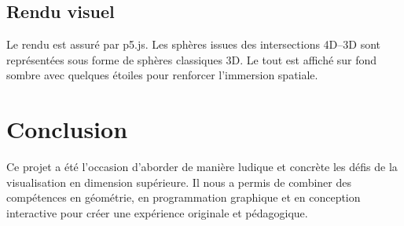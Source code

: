 \documentclass[11pt,a4paper]{article}
\begin{document}
\subsection{Rendu visuel}

Le rendu est assuré par p5.js. Les sphères issues des intersections 4D–3D sont représentées sous forme de sphères classiques 3D. Le tout est affiché sur fond sombre avec quelques étoiles pour renforcer l’immersion spatiale.

\section{Conclusion}

Ce projet a été l’occasion d’aborder de manière ludique et concrète les défis de la visualisation en dimension supérieure. Il nous a permis de combiner des compétences en géométrie, en programmation graphique et en conception interactive pour créer une expérience originale et pédagogique.
\end{document}
